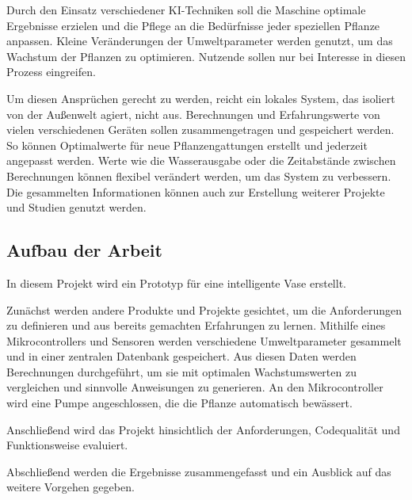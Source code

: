 Durch den Einsatz verschiedener KI-Techniken soll die Maschine optimale Ergebnisse erzielen und die Pflege an die Bedürfnisse jeder speziellen Pflanze anpassen. Kleine Veränderungen der Umweltparameter werden genutzt, um das Wachstum der Pflanzen zu optimieren. Nutzende sollen nur bei Interesse in diesen Prozess eingreifen.

Um diesen Ansprüchen gerecht zu werden, reicht ein lokales System, das isoliert von der Außenwelt agiert, nicht aus. Berechnungen und Erfahrungswerte von vielen verschiedenen Geräten sollen zusammengetragen und gespeichert werden. So können Optimalwerte für neue Pflanzengattungen erstellt und jederzeit angepasst werden. Werte wie die Wasserausgabe oder die Zeitabstände zwischen Berechnungen können flexibel verändert werden, um das System zu verbessern. Die gesammelten Informationen können auch zur Erstellung weiterer Projekte und Studien genutzt werden.

\subsection{Aufbau der Arbeit}
In diesem Projekt wird ein Prototyp für eine intelligente Vase erstellt.

Zunächst werden andere Produkte und Projekte gesichtet, um die Anforderungen zu definieren und aus bereits gemachten Erfahrungen zu lernen. Mithilfe eines Mikrocontrollers und Sensoren werden verschiedene Umweltparameter gesammelt und in einer zentralen Datenbank gespeichert. Aus diesen Daten werden Berechnungen durchgeführt, um sie mit optimalen Wachstumswerten zu vergleichen und sinnvolle Anweisungen zu generieren. An den Mikrocontroller wird eine Pumpe angeschlossen, die die Pflanze automatisch bewässert.

Anschließend wird das Projekt hinsichtlich der Anforderungen, Codequalität und Funktionsweise evaluiert.

Abschließend werden die Ergebnisse zusammengefasst und ein Ausblick auf das weitere Vorgehen gegeben.